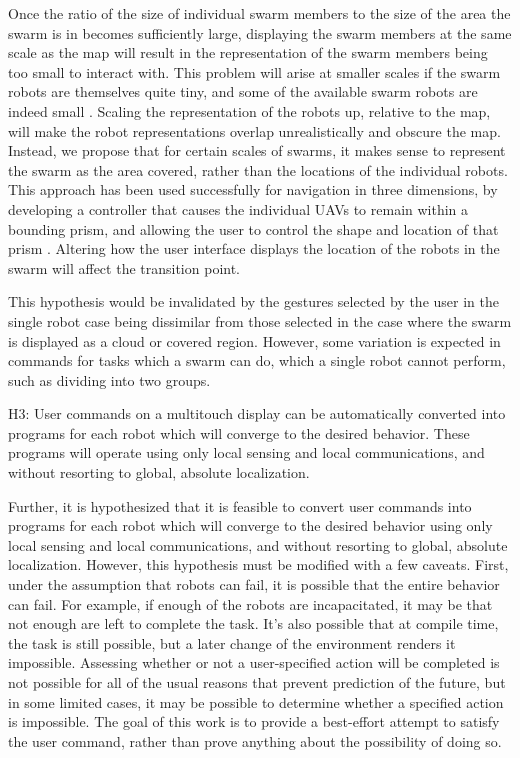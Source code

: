 Once the ratio of the size of individual swarm members to the size of the area the swarm is in becomes sufficiently large, displaying the swarm members at the same scale as the map will result in the representation of the swarm members being too small to interact with. 
This problem will arise at smaller scales if the swarm robots are themselves quite tiny, and some of the available swarm robots are indeed small \citep{pelrine2012diamagnetically}.
Scaling the representation of the robots up, relative to the map, will make the robot representations overlap unrealistically and obscure the map. 
Instead, we propose that for certain scales of swarms, it makes sense to represent the swarm as the area covered, rather than the locations of the individual robots.
This approach has been used successfully for navigation in three dimensions, by developing a controller that causes the individual UAVs to remain within a bounding prism, and allowing the user to control the shape and location of that prism \citep{ayanian2014controlling}.
Altering how the user interface displays the location of the robots in the swarm will affect the transition point. 

This hypothesis would be invalidated by the gestures selected by the user in the single robot case being dissimilar from those selected in the case where the swarm is displayed as a cloud or covered region. 
However, some variation is expected in commands for tasks which a swarm can do, which a single robot cannot perform, such as dividing into two groups. 

H3: User commands on a multitouch display can be automatically converted into programs for each robot which will converge to the desired behavior. These programs will operate using only local sensing and local communications, and without resorting to global, absolute localization. 

Further, it is hypothesized that it is feasible  to convert user commands into programs for each robot which will converge to the desired behavior using only local sensing and local communications, and without resorting to global, absolute localization. 
However, this hypothesis must be modified with a few caveats. 
First, under the assumption that robots can fail, it is possible that the entire behavior can fail. 
For example, if enough of the robots are incapacitated, it may be that not enough are left to complete the task. 
It's also possible that at compile time, the task is still possible, but a later change of the environment renders it impossible. 
Assessing whether or not a user-specified action will be completed is not possible for all of the usual reasons that prevent prediction of the future, but in some limited cases, it may be possible to determine whether a specified action is impossible. The goal of this work is to provide a best-effort attempt to satisfy the user command, rather than prove anything about the possibility of doing so. 


